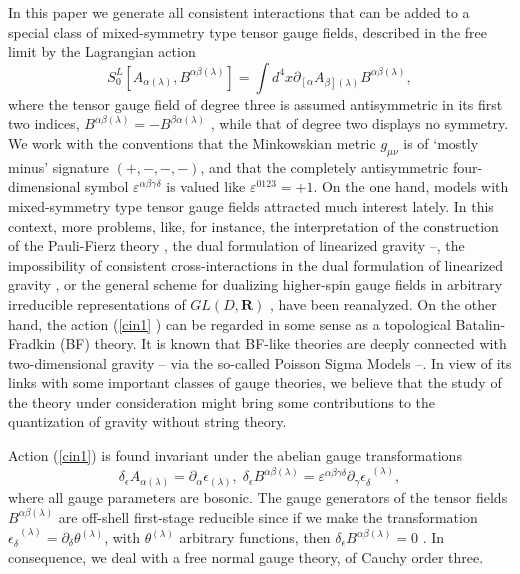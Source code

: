 \documentclass[a4paper,12pt]{article}
\begin{document}
In this paper we generate all consistent interactions that can be added to a
special class of mixed-symmetry type tensor gauge fields, described in the
free limit by the Lagrangian action
\begin{equation}
S_{0}^{L}\left[ A_{\alpha (\lambda )},B^{\alpha \beta (\lambda )}\right]
=\int d^{4}x\partial _{\left[ \alpha \right. }A_{\left. \beta \right]
(\lambda )}B^{\alpha \beta (\lambda )},  \label{cin1}
\end{equation}
where the tensor gauge field of degree three is assumed antisymmetric in its
first two indices, $B^{\alpha \beta (\lambda )}=-B^{\beta \alpha (\lambda )}$%
, while that of degree two displays no symmetry. We work with the
conventions that the Minkowskian metric $g_{\mu \nu }$ is of
`mostly minus' signature $\left( +,-,-,-\right) $, and that the
completely antisymmetric four-dimensional symbol $\varepsilon
^{\alpha \beta \gamma \delta }$ is valued like $\varepsilon
^{0123}=+1$. On the one hand, models with mixed-symmetry type
tensor gauge fields attracted much interest lately. In this
context, more problems, like, for instance, the interpretation of
the construction of the Pauli-Fierz theory \cite{pf}, the dual
formulation of linearized gravity \cite{dual}--\cite{lingr}, the
impossibility of consistent cross-interactions in the dual
formulation of linearized gravity \cite{lingr},  or the general
scheme for dualizing higher-spin gauge fields in arbitrary
irreducible representations of $GL(D,\mathbf{R})$ \cite{dualsp},
have been reanalyzed. On the other hand, the action (\ref{cin1}%
) can be regarded in some sense as a topological Batalin-Fradkin
(BF) theory. It is known that BF-like theories are deeply
connected with two-dimensional gravity \cite{gr1}--\cite{gr7} via
the so-called Poisson Sigma Models \cite{psm1}--\cite{psm7}. In
view of its links with some important classes of gauge theories,
we believe that the study of the theory under consideration might
bring some contributions to the quantization of gravity without
string theory.

Action (\ref{cin1}) is found invariant under the abelian gauge
transformations
\begin{equation}
\delta _{\epsilon }A_{\alpha (\lambda )}=\partial _{\alpha }\epsilon
_{(\lambda )},\;\delta _{\epsilon }B^{\alpha \beta (\lambda )}=\varepsilon
^{\alpha \beta \gamma \delta }\partial _{\gamma }\epsilon _{\delta
}^{\;\;(\lambda )},  \label{cin2}
\end{equation}
where all gauge parameters are bosonic. The gauge generators of the tensor
fields $B^{\alpha \beta (\lambda )}$ are off-shell first-stage reducible
since if we make the transformation $\epsilon _{\delta }^{\;\;(\lambda
)}=\partial _{\delta }\theta ^{(\lambda )}$, with $\theta ^{(\lambda )}$
arbitrary functions, then $\delta _{\epsilon }B^{\alpha \beta (\lambda )}=0$%
. In consequence, we deal with a free normal gauge theory, of Cauchy order
three.
\end{document}
